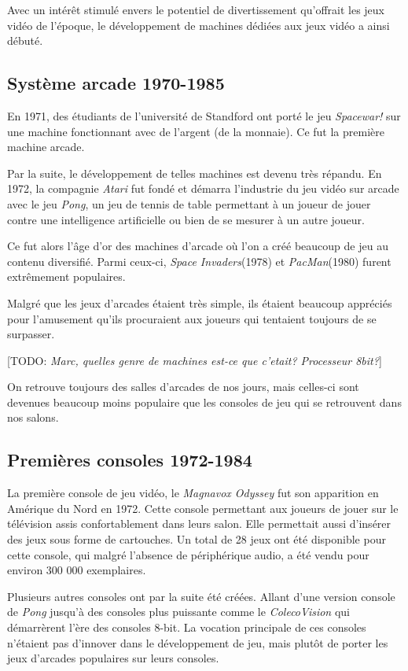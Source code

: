 \documentclass[12pt,oneside,letterpaper,francais]{book}
\newcommand{\todo}[1]{[TODO: {\it #1}]}
\begin{document}
Avec un intérêt stimulé envers le potentiel de divertissement
qu'offrait les jeux vidéo de l'époque, le développement de machines
dédiées aux jeux vidéo a ainsi débuté.

\subsection{Système arcade 1970-1985}
En 1971, des étudiants de l'université de Standford ont porté le jeu
\textit{Spacewar!} sur une machine fonctionnant avec de l'argent (de
la monnaie). Ce fut la première machine arcade.

Par la suite, le développement de telles machines est devenu très
répandu. En 1972, la compagnie \textit{Atari} fut fondé et démarra
l'industrie du jeu vidéo sur arcade avec le jeu \textit{Pong}, un jeu
de tennis de table permettant à un joueur de jouer contre une
intelligence artificielle ou bien de se mesurer à un autre joueur.

Ce fut alors l'âge d'or des machines d'arcade où l'on a créé beaucoup
de jeu au contenu diversifié. Parmi ceux-ci, \textit{Space
  Invaders}(1978) et \textit{PacMan}(1980) furent extrêmement
populaires. 

Malgré que les jeux d'arcades étaient très simple, ils étaient
beaucoup appréciés pour l'amusement qu'ils procuraient aux joueurs qui
tentaient toujours de se surpasser.

\todo{Marc, quelles genre de machines est-ce que c'etait? Processeur
  8bit?}

On retrouve toujours des salles d'arcades de nos jours, mais celles-ci
sont devenues beaucoup moins populaire que les consoles de jeu qui se
retrouvent dans nos salons.

\subsection{Premières consoles 1972-1984}

La première console de jeu vidéo, le \textit{Magnavox Odyssey} fut son
apparition en Amérique du Nord en 1972. Cette console permettant aux
joueurs de jouer sur le télévision assis confortablement dans leurs
salon. Elle permettait aussi d'insérer des jeux sous forme de
cartouches. Un total de 28 jeux ont été disponible pour cette console,
qui malgré l'absence de périphérique audio, a été vendu pour environ
300 000 exemplaires.

Plusieurs autres consoles ont par la suite été créées. Allant d'une
version console de \textit{Pong} jusqu'à des consoles plus puissante
comme le \textit{ColecoVision} qui démarrèrent l'ère des consoles
8-bit. La vocation principale de ces consoles n'étaient pas d'innover
dans le développement de jeu, mais plutôt de porter les jeux
d'arcades populaires sur leurs consoles.
\end{document}
